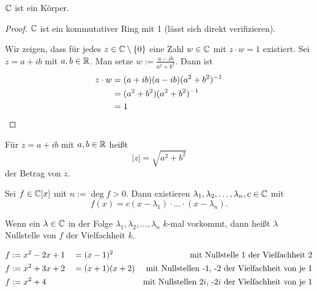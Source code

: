 \begin{propn}
	$ \mathbb C $ ist ein Körper.
\end{propn}
\begin{proof}
	$ \mathbb C $ ist ein kommutativer Ring mit 1 (lässt sich direkt verifizieren).

	Wir zeigen, dass für jedes $ z \in \mathbb C\setminus\{0\} $ eine Zahl $ w \in \mathbb C $ mit $ z \cdot w = 1 $ existiert. Sei $ z = a+ib $ mit $ a,b \in \mathbb R $. Man setze $ w := \frac{a-ib}{a^2+b^2} $. Dann ist
	\begin{align*}
		z \cdot w &= (a+ib)(a-ib)(a^2+b^2)^{-1} \\
			&= (a^2 + b^2)(a^2+b^2)^{-1} \\
			&= 1 \qedhere
	\end{align*}
\end{proof}
 
Für $ z = a+ib $ mit $ a,b \in \mathbb R $ heißt
\begin{equation*}
	|z| = \sqrt{a^2+b^2}
\end{equation*}
der Betrag von $ z $.

\begin{thm}
	Sei $ f \in \mathbb C[x] $ mit $ n := \deg f > 0 $. Dann existieren $ \lambda_1, \lambda_2, \ldots, \lambda_n, c \in \mathbb C $ mit
	\begin{equation}
		f(x) = c(x-\lambda_1) \cdot \ldots \cdot (x - \lambda_n).
	\end{equation}
\end{thm}

\begin{bem}
	Wenn ein $ \lambda \in \mathbb C $ in der Folge $ \lambda_1, \lambda_2, \ldots, \lambda_n $ $ k $-mal vorkommt, dann heißt $ \lambda $ Nullstelle von $ f $ der Vielfachheit $ k $.
\end{bem}

\begin{bsp}
\begin{align*}
	f &:= x^2 -2x +1 &&= (x-1)^2 & \text{mit Nullstelle 1 der Vielfachheit 2} \\
	f &:= x^2 +3x +2 &&= (x+1)(x+2) & \text{mit Nullstellen -1, -2 der Vielfachheit von je 1} \\
	f &:= x^2 +4 && & \text{mit Nullstellen 2$ i $, -2$ i $ der Vielfachheit von je 1}
\end{align*}
\end{bsp}
